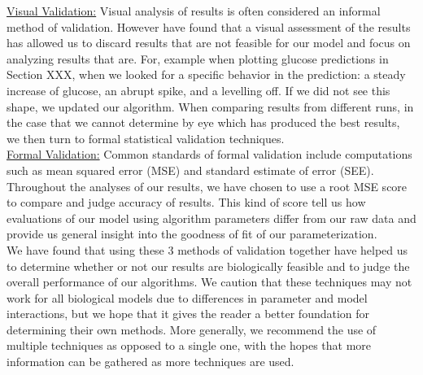 \documentclass{article}
\begin{document}
\underline{Visual Validation:} Visual analysis of results is often considered an informal method of validation. However have found that a visual assessment of the results has allowed us to discard results that are not feasible for our model and focus on analyzing results that are. For, example when plotting glucose predictions in Section XXX, when we looked for a specific behavior in the prediction: a steady increase of glucose, an abrupt spike, and a levelling off. If we did not see this shape, we updated our algorithm. When comparing results from different runs, in the case that we cannot determine by eye which has produced the best results, we then turn to formal statistical validation techniques.\vspace{4 mm} \\
\underline{Formal Validation:} Common standards of formal validation include computations such as mean squared error (MSE) and standard estimate of error (SEE). Throughout the analyses of our results, we have chosen to use a root MSE score to compare and judge accuracy of results. This kind of score tell us how evaluations of our model using algorithm parameters differ from our raw data and provide us general insight into the goodness of fit of our parameterization. \vspace{3 mm} \\

We have found that using these 3 methods of validation together have helped us to determine whether or not our results are biologically feasible and to judge the overall performance of our algorithms. We caution that these techniques may not work for all biological models due to differences in parameter and model interactions, but we hope that it gives the reader a better foundation for determining their own methods. More generally, we recommend the use of multiple techniques as opposed to a single one, with the hopes that more information can be gathered as more techniques are used.
\end{document}
